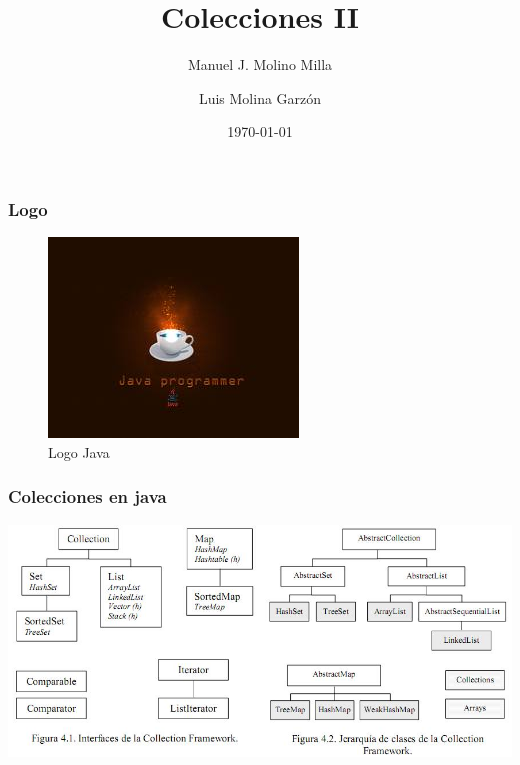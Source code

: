 \documentclass{beamer}
\title{Colecciones II}
\author{Manuel J. Molino Milla \and Luis Molina Garzón}
\date{\today} %
\institute{IES Virgen del Carmen \and Departamento de Informática}
\begin{document}
\begin{frame}
  \titlepage
\end{frame}

\begin{frame}
    \frametitle{Logo}
\begin{figure}
\includegraphics[scale=1]{imagenes/logo.jpeg} 
\caption{Logo Java}
\end{figure}
\end{frame}





\begin{frame}
\frametitle{Colecciones en java}
\includegraphics[scale=0.45]{imagenes/colecciones.jpeg}
\end{frame}
\end{document}
